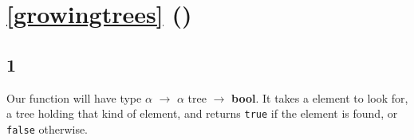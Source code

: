 \documentclass[]{book}
\newcommand{\pletrec}{\textbf{let rec}\xspace}
\newcommand{\pmatch}{\textbf{match}\xspace}
\newcommand{\pwith}{\textbf{with}\xspace}
\newcommand{\pand}{\textbf{and}\xspace}
\newcommand{\smspace}{\vspace{4mm}}
\begin{document}

\section*{\ref{growingtrees} ()}

\subsection*{1}
Our function will have type \textrm{$\alpha$ $\rightarrow$ $\alpha$ tree $\rightarrow$ \textbf{bool}}. It takes a element to look for, a tree holding that kind of element, and returns \texttt{true} if the element is found, or \texttt{false} otherwise.
\end{document}
